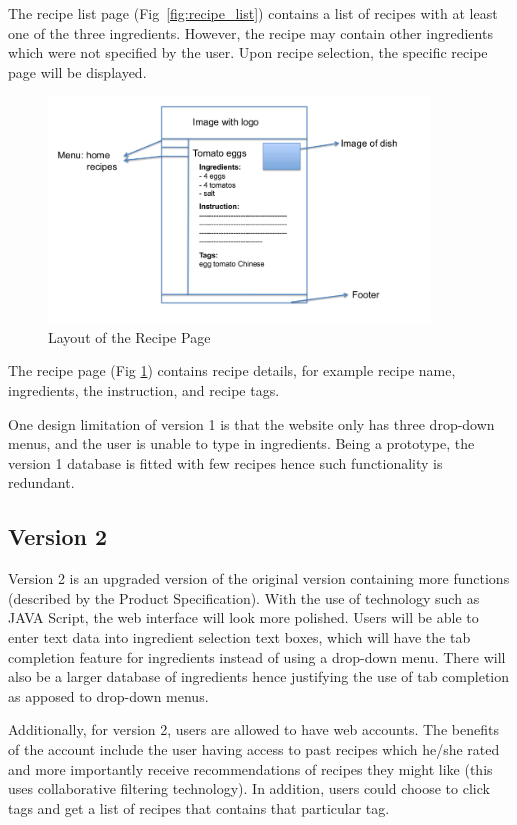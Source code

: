 The recipe list page (Fig~\ref{fig:recipe_list}) contains a list of recipes with at least one of the three ingredients. However, the recipe may contain other ingredients which were not specified by the user. Upon recipe selection, the specific recipe page will be displayed.

\begin{figure}
\includegraphics[width=0.9\textwidth]{recipe_page}
\caption{Layout of the Recipe Page}
\label{fig:recipe_page}
\end{figure}

The recipe page (Fig \ref{fig:recipe_page}) contains recipe details, for example recipe name, ingredients, the instruction, and recipe tags.
 
One design limitation of version 1 is that the website only has three drop-down menus, and the user is unable to type in ingredients. Being a prototype, the version 1 database is fitted with few recipes hence such functionality is redundant. 

\subsection{Version 2}
Version 2 is an upgraded version of the original version containing more functions (described by the Product Specification). With the use of technology such as JAVA Script, the web interface will look more polished. Users will be able to enter text data into ingredient selection text boxes, which will have the tab completion feature for ingredients instead of using a drop-down menu. There will also be a larger database of ingredients hence justifying the use of tab completion as apposed to drop-down menus.

Additionally, for version 2, users are allowed to have web accounts. The benefits of the account include the user having access to past recipes which he/she rated and more importantly receive recommendations of recipes they might like (this uses collaborative filtering technology). In addition, users could choose to click tags and get a list of recipes that contains that particular tag.

